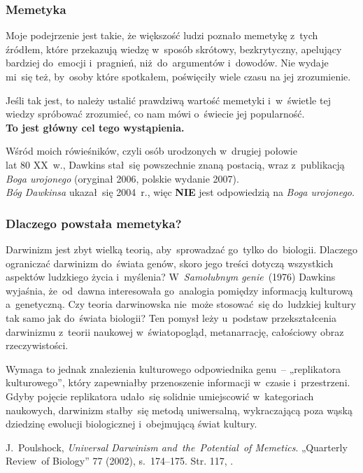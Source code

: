 \documentclass[10pt,t]{beamer}
\begin{document}
\begin{frame}
  \frametitle{Memetyka}


  Moje podejrzenie jest takie, że większość ludzi poznało
  memetykę z~tych źródłem, które przekazują wiedzę w~sposób skrótowy,
  bezkrytyczny, apelujący bardziej do~emocji i~pragnień, niż~do~argumentów
  i~dowodów. Nie wydaje mi~się też, by~osoby które spotkałem, poświęciły
  wiele czasu na jej zrozumienie.


  Jeśli tak jest, to należy ustalić prawdziwą wartość memetyki i~w~świetle
  tej wiedzy spróbować zrozumieć, co nam mówi o~świecie jej popularność. \\
  \textbf{To jest główny cel tego wystąpienia.}

  Wśród moich rówieśników, czyli osób urodzonych w~drugiej połowie \\
  lat 80 XX~w., Dawkins stał~się powszechnie znaną postacią, wraz
  z~publikacją \textit{Boga urojonego} (oryginał 2006, polskie wydanie
  2007). \\
  \textit{Bóg Dawkinsa} ukazał~się 2004~r., więc \textbf{NIE} jest
  odpowiedzią na \textit{Boga urojonego}.

\end{frame}





\begin{frame}
  \frametitle{Dlaczego powstała memetyka?}


  Darwinizm jest zbyt wielką teorią, aby~sprowadzać
  go~tylko do~biologii. Dlaczego ograniczać darwinizm do~świata
  genów, skoro jego treści dotyczą wszystkich aspektów ludzkiego
  życia i~myślenia? W~\textit{Samolubnym genie}~(1976) Dawkins
  wyjaśnia, że~od~dawna interesowała go~analogia pomiędzy informacją
  kulturową a~genetyczną. Czy teoria darwinowska nie~może
  stosować~się do~ludzkiej kultury tak samo jak do~świata biologii?
  Ten pomysł leży u~podstaw przekształcenia darwinizmu z~teorii
  naukowej w~światopogląd, metanarrację, całościowy obraz
  rzeczywistości.

  Wymaga to jednak znalezienia kulturowego odpowiednika
  genu~-- „replikatora kulturowego”, który zapewniałby
  przenoszenie informacji w~czasie i~przestrzeni. Gdyby pojęcie
  replikatora udało~się solidnie umiejscowić w~kategoriach
  naukowych, darwinizm stałby~się metodą uniwersalną, wykraczającą
  poza wąską dziedzinę ewolucji biologicznej i~obejmującą świat
  kultury.

  J.~Poulshock, \textit{Universal Darwinism
    and~the~Potential~of Memetics}. „Quarterly Review~of Biology”
  77 (2002), s.~174--175. Str. 117, \cite{McGrathBogDawkinsa2008}.

\end{frame}
\end{document}
